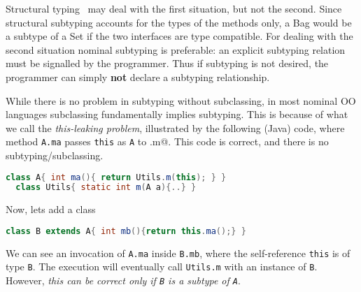\noindent Structural typing~\cite{cook} may deal with the first
situation, but not the second. Since structural subtyping
accounts for the types of the methods only, a Bag would be a subtype
of a Set if the two interfaces are type compatible. For dealing with
the second situation nominal subtyping is preferable: an explicit subtyping relation must be signalled by the programmer. Thus if subtyping is not desired, the
programmer can simply {\bf not} declare a subtyping relationship.

While there is no problem in subtyping without subclassing, in most nominal OO languages subclassing fundamentally implies subtyping. 
This is because of what we call the
\emph{this-leaking problem}, illustrated by the following
(Java) code, where
method \lstinline{A.ma} passes \lstinline{this} as \lstinline{A} to \Q@Utils.m@.
This code is correct, and there is no subtyping/subclassing{.}\saveSpace\saveSpace
\begin{lstlisting}[language=Java]
  class A{ int ma(){ return Utils.m(this); } }
  class Utils{ static int m(A a){..} }
\end{lstlisting}
\saveSpace\saveSpace
  Now, lets add a class \Q@B@
\saveSpace\saveSpace\saveSpace
\begin{lstlisting}[language=Java]
  class B extends A{ int mb(){return this.ma();} }  
\end{lstlisting}
\saveSpace\saveSpace
\noindent We can see an invocation of \lstinline{A.ma} inside
\lstinline{B.mb}, where the self-reference \lstinline{this} is of type \lstinline{B}. 
The execution will eventually call \lstinline{Utils.m} with an
instance of \lstinline{B}. However, \emph{this can be correct only if \lstinline{B} is a subtype of
\lstinline{A}}. 

%
%


